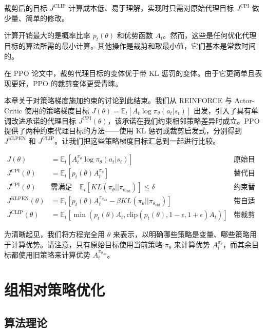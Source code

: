 \documentclass[lang=cn,newtx,10pt,scheme=chinese]{elegantbook}
\begin{document}
裁剪后的目标 $J^\text{CLIP}$ 计算成本低、易于理解，实现时只需对原始代理目标 $J^\text{CPI}$ 做少量、简单的修改。

计算开销最大的是概率比率 $p_t(\theta)$ 和优势函数 $A_t$。然而，这些是任何优化代理目标的算法所需的最小计算。其他操作是裁剪和取最小值，它们基本是常数时间的。

在 PPO 论文中，裁剪代理目标的变体优于带 KL 惩罚的变体。由于它更简单且表现更好，PPO 的裁剪变体更受青睐。

本章关于对策略梯度施加约束的讨论到此结束。我们从 REINFORCE 与 Actor-Critic 使用的策略梯度目标 $J(\theta)=\mathbb{E}_t\left[ A_t\log\pi_\theta(a_t|s_t) \right]$ 出发，引入了具有单调改进承诺的代理目标 $J^\text{CPI}(\theta)$，该承诺在我们约束相邻策略差异时成立。PPO 提供了两种约束代理目标的方法——使用 KL 惩罚或裁剪启发式，分别得到 $J^\text{KLPEN}$ 和 $J^\text{CLIP}$。让我们把这些策略梯度目标汇总到一起进行比较。

\begin{align}
J(\theta) & = \mathbb{E}_t\left[ A_t^{\pi_\theta}\log\pi_\theta(a_t|s_t) \right] & \textit{原始目标} \\
J^{\text{CPI}}(\theta) & = \mathbb{E}_t\left[ p_t(\theta)A_t^{\pi_\theta} \right] & \textit{替代目标} \\
J^{\text{CPI}}(\theta) \quad & \text{需满足}\quad \mathbb{E}_t\left[ KL(\pi_\theta||\pi_{\theta_\text{old}}) \right]\leq\delta & \textit{约束替代目标} \\
J^{\text{KLPEN}}(\theta) & = \mathbb{E}_t\left[ p_t(\theta)A^{\pi_{\theta_\text{old}}}_t - \beta KL(\pi_\theta||\pi_{\theta_\text{old}}) \right] & \textit{带自适应KL惩罚的PPO} \\
J^{\text{CLIP}}(\theta) & = \mathbb{E}_t\left[ \min\left( p_t(\theta)A_t, \text{clip}\left( p_t(\theta), 1-\epsilon, 1+\epsilon \right)A_t \right) \right] & \textit{带裁剪的PPO}
\end{align}

为清晰起见，我们将方程完全用 $\theta$ 来表示，以明确哪些策略是变量、哪些策略用于计算优势。请注意，只有原始目标使用当前策略 $\pi_\theta$ 来计算优势 $A_t^{\pi_\theta}$，而其余目标都使用旧策略来计算优势 $A_t^{\pi_{\theta_\text{old}}}$。

\chapter{组相对策略优化}

\section{算法理论}
\end{document}
